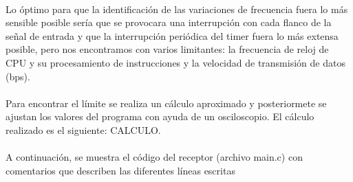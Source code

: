 \paragraph{} Lo óptimo para que la identificación de las variaciones de frecuencia fuera lo más sensible posible sería que se provocara una interrupción con cada flanco de la señal de entrada y que la interrupción periódica del timer fuera lo más extensa posible, pero nos encontramos con varios limitantes: la frecuencia de reloj de CPU y su procesamiento de instrucciones y la velocidad de transmisión de datos (bps).
\paragraph{} Para encontrar el límite se realiza un cálculo aproximado y posteriormete se ajustan los valores del programa con ayuda de un osciloscopio. El cálculo realizado es el siguiente: CALCULO.

\paragraph{} A continuación, se muestra el código del receptor (archivo main.c) con comentarios que describen las diferentes líneas escritas


